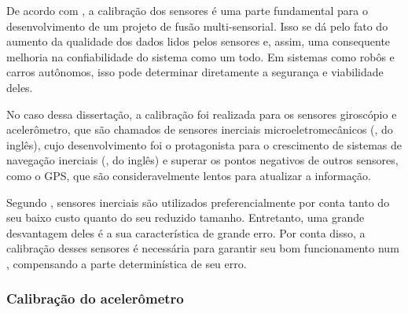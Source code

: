 \documentclass[acronym, symbols, table, deposito]{fei}
\begin{document}
		
		
		De acordo com \textcite{lv2020targetless}, a calibração dos sensores é uma parte fundamental para o desenvolvimento de um projeto de fusão multi-sensorial. Isso se dá pelo fato do aumento da qualidade dos dados lidos pelos sensores e, assim, uma consequente melhoria na confiabilidade do sistema como um todo. Em sistemas como robôs e carros autônomos, isso pode determinar diretamente a segurança e viabilidade deles.
		
		No caso dessa dissertação, a calibração foi realizada para os sensores giroscópio e acelerômetro, que são chamados de sensores inerciais microeletromecânicos (, do inglês), cujo desenvolvimento foi o protagonista para o crescimento de sistemas de navegação inerciais (, do inglês) e superar os pontos negativos de outros sensores, como o GPS, que são consideravelmente lentos para atualizar a informação.
		
		Segundo \textcite{9181212}, sensores inerciais  são utilizados preferencialmente por conta tanto do seu baixo custo quanto do seu reduzido tamanho. Entretanto, uma grande desvantagem deles é a sua característica de grande erro. Por conta disso, a calibração desses sensores é necessária para garantir seu bom funcionamento num , compensando a parte determinística de seu erro.
		
			\subsubsection{Calibração do acelerômetro} \label{sec:calibracao_acelerometro}
			
\end{document}
